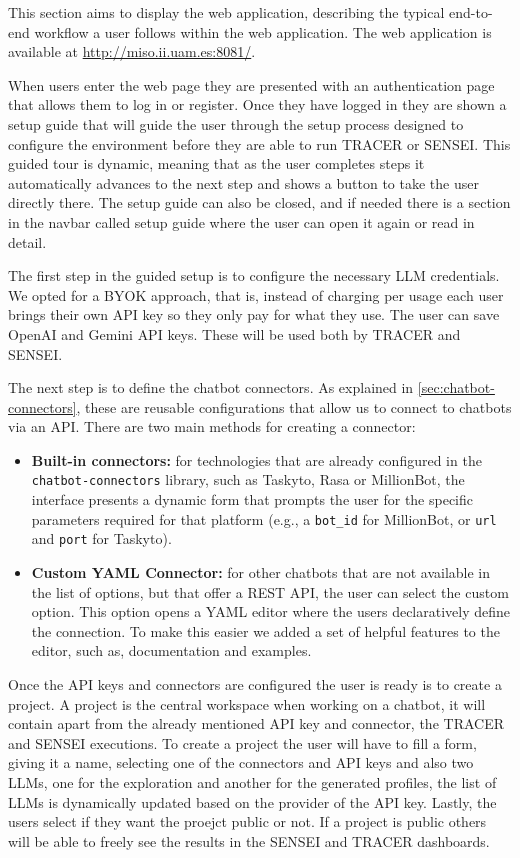 This section aims to display the web application,
describing the typical end-to-end workflow
a user follows within the web application.
The web application is available at \url{http://miso.ii.uam.es:8081/}.

When users enter the web page
they are presented with an authentication page
that allows them to log in or register.
Once they have logged in they are shown
a setup guide that will guide the user
through the setup process designed to configure the environment
before they are able to run \ac{TRACER} or SENSEI.
This guided tour is dynamic,
meaning that as the user completes steps
it automatically advances to the next step
and shows a button to take the user directly there.
The setup guide can also be closed,
and if needed there is a section in the navbar called setup guide
where the user can open it again or read in detail.

The first step in the guided setup
is to configure the necessary \ac{LLM} credentials.
We opted for a \ac{BYOK} approach,
that is, instead of charging per usage
each user brings their own \ac{API} key
so they only pay for what they use.
The user can save OpenAI and Gemini \ac{API} keys.
These will be used both by \ac{TRACER} and SENSEI.

The next step is to define the chatbot connectors.
As explained in \autoref{sec:chatbot-connectors},
these are reusable configurations
that allow us to connect to chatbots via an \ac{API}.
There are two main methods for creating a connector:
\begin{itemize}
  \item \textbf{Built-in connectors:}
    for technologies that are already configured
    in the \texttt{chatbot-connectors} library,
    such as Taskyto, Rasa or MillionBot,
    the interface presents a dynamic form
    that prompts the user for the specific parameters
    required for that platform
    (e.g., a \texttt{bot\_id} for MillionBot,
    or \texttt{url} and \texttt{port} for Taskyto).
  \item \textbf{Custom YAML Connector:}
    for other chatbots that are not available in the list of options,
    but that offer a \ac{REST} \ac{API},
    the user can select the custom option.
    This option opens a YAML editor
    where the users declaratively define the connection.
    To make this easier we added a set of helpful features to the editor,
    such as, documentation and examples.
\end{itemize}

Once the \ac{API} keys and connectors are configured
the user is ready is to create a project.
A project is the central workspace when working on a chatbot,
it will contain apart from the already mentioned \ac{API} key and connector,
the \ac{TRACER} and SENSEI executions.
To create a project the user will have to fill a form,
giving it a name, selecting one of the connectors and \ac{API} keys
and also two \acp{LLM}, one for the exploration and another for the generated profiles,
the list of \acp{LLM} is dynamically updated based on the provider of the \ac{API} key.
Lastly, the users select if they want the proejct public or not.
If a project is public others will be able to freely see the results
in the SENSEI and \ac{TRACER} dashboards.

